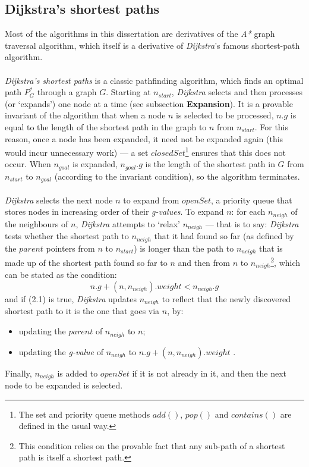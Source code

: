\documentclass[12pt,notitlepage]{report}
\begin{document}
\subsection {Dijkstra's shortest paths}

Most of the algorithms in this dissertation are derivatives of the {\em A*} graph traversal algorithm, which itself is a derivative of {\em Dijkstra}'s famous shortest-path algorithm.\\

\\
\noindent
{\em Dijkstra's shortest paths} is a classic pathfinding algorithm, which finds an optimal path\cite{Dij59} $P^{*}_{G}$ through a graph $G$. Starting at $n_{start}$, {\em Dijkstra} selects and then processes (or `expands') one node at a time (see subsection {\bfseries Expansion}). It is a provable\cite{CormenDijkstra} invariant of the algorithm that when a node $n$ is selected to be processed, $n.g$ is equal to the length of the shortest path in the graph to $n$ from $n_{start}$. For this reason, once a node has been expanded, it need not be expanded again (this would incur unnecessary work) --- a set $closedSet$\footnote{The set and priority queue methods $add()$, $pop()$ and  $contains()$ are defined in the usual way.} ensures that this does not occur. When $n_{goal}$ is expanded, $n_{goal}.g$ is the length of the shortest path in $G$ from $n_{start}$ to $n_{goal}$ (according to the invariant condition), so the algorithm terminates.\\

\\
\noindent
{\em Dijkstra} selects the next node $n$ to expand from $openSet$, a priority queue that stores nodes in increasing order of their {\em g-values}. To expand $n$: for each $n_{neigh}$ of the neighbours of $n$, {\em Dijkstra} attempts to `relax' $n_{neigh}$ --- that is to say: {\em Dijkstra} tests whether the shortest path to $n_{neigh}$ that it had found so far (as defined by the $parent$ pointers from $n$ to $n_{start}$) is longer than the path to $n_{neigh}$ that is made up of the shortest path found so far to $n$ and then from $n$ to $n_{neigh}$\footnote{This condition relies on the provable\cite{CormenDijkstra} fact that any sub-path of a shortest path is itself a shortest path.}, which can be stated as the condition:
\begin{equation}
n.g + (n,n_{neigh}).weight < n_{neigh}.g
\end{equation}
\noindent
and if (2.1) is true, {\em Dijkstra} updates $n_{neigh}$ to reflect that the newly discovered shortest path to it is the one that goes via $n$, by: 
\begin{itemize}
\item updating the $parent$ of $n_{neigh}$ to $n$;
\item updating the {\em g-value} of $n_{neigh}$ to $n.g + (n,n_{neigh}).weight$ .
\end{itemize}
Finally, $n_{neigh}$ is added to $openSet$ if it is not already in it, and then the next node to be expanded is selected.\\
\end{document}
